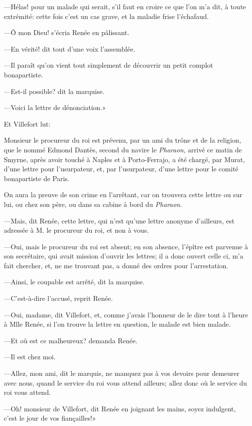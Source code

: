 —Hélas! pour un malade qui serait, s'il faut en croire ce que l'on m'a dit, à toute extrémité: cette fois c'est un cas grave, et la maladie frise l'échafaud.

—Ô mon Dieu! s'écria Renée en pâlissant.

—En vérité! dit tout d'une voix l'assemblée.

—Il paraît qu'on vient tout simplement de découvrir un petit complot bonapartiste.

—Est-il possible? dit la marquise.

—Voici la lettre de dénonciation.»

Et Villefort lut:

\begin{mail}{}{}
Monsieur le procureur du roi est prévenu, par un ami du trône et de la religion, que le nommé Edmond Dantès, second du navire le \textit{Pharaon}, arrivé ce matin de Smyrne, après avoir touché à Naples et à Porto-Ferrajo, a été chargé, par Murat, d'une lettre pour l'usurpateur, et, par l'usurpateur, d'une lettre pour le comité bonapartiste de Paris.

On aura la preuve de son crime en l'arrêtant, car on trouvera cette lettre ou sur lui, ou chez son père, ou dans sa cabine à bord du \textit{Pharaon}.
\end{mail}

—Mais, dit Renée, cette lettre, qui n'est qu'une lettre anonyme d'ailleurs, est adressée à M. le procureur du roi, et non à vous.

—Oui, mais le procureur du roi est absent; en son absence, l'épître est parvenue à son secrétaire, qui avait mission d'ouvrir les lettres; il a donc ouvert celle ci, m'a fait chercher, et, ne me trouvant pas, a donné des ordres pour l'arrestation.

—Ainsi, le coupable est arrêté, dit la marquise.

—C'est-à-dire l'accusé, reprit Renée.

—Oui, madame, dit Villefort, et, comme j'avais l'honneur de le dire tout à l'heure à Mlle Renée, si l'on trouve la lettre en question, le malade est bien malade.

—Et où est ce malheureux? demanda Renée.

—Il est chez moi.

—Allez, mon ami, dit le marquis, ne manquez pas à vos devoirs pour demeurer avec nous, quand le service du roi vous attend ailleurs; allez donc où le service du roi vous attend.

—Oh! monsieur de Villefort, dit Renée en joignant les mains, soyez indulgent, c'est le jour de vos fiançailles!»

